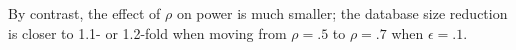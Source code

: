 By contrast, the effect of $\rho$ on power is much smaller; the database size
reduction is closer to 1.1- or 1.2-fold when moving from $\rho = .5$ to $\rho = .7$
when $\epsilon = .1$.




% 
% 
% 






